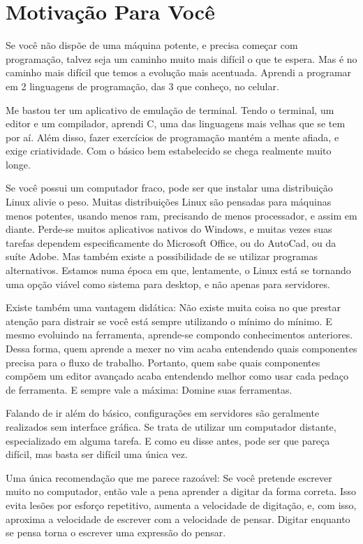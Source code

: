 \section{Motivação Para Você}
Se você não dispõe de uma máquina potente, e precisa começar com programação, talvez seja um caminho muito mais difícil o que te espera.
Mas é no caminho mais difícil que temos a evolução mais acentuada.
Aprendi a programar em 2 linguagens de programação, das 3 que conheço, no celular.

Me bastou ter um aplicativo de emulação de terminal.
Tendo o terminal, um editor e um compilador, aprendi C, uma das linguagens mais velhas que se tem por aí.
Além disso, fazer exercícios de programação mantém a mente afiada, e exige criatividade.
Com o básico bem estabelecido se chega realmente muito longe.


Se você possui um computador fraco, pode ser que instalar uma distribuição Linux alivie o peso.
Muitas distribuições Linux são pensadas para máquinas menos potentes, usando menos ram, precisando de menos processador, e assim em diante.
Perde-se muitos aplicativos nativos do Windows, e muitas vezes suas tarefas dependem especificamente do Microsoft Office, ou do AutoCad, ou da suíte Adobe.
Mas também existe a possibilidade de se utilizar programas alternativos.
Estamos numa época em que, lentamente, o Linux está se tornando uma opção viável como sistema para desktop, e não apenas para servidores.

Existe também uma vantagem didática:
Não existe muita coisa no que prestar atenção para distrair se você está sempre utilizando o mínimo do mínimo.
E mesmo evoluindo na ferramenta, aprende-se compondo conhecimentos anteriores.
Dessa forma, quem aprende a mexer no vim acaba entendendo quais componentes precisa para o fluxo de trabalho.
Portanto, quem sabe quais componentes compõem um editor avançado acaba entendendo melhor como usar cada pedaço de ferramenta.
E sempre vale a máxima: Domine suas ferramentas.

Falando de ir além do básico, configurações em servidores são geralmente realizados sem interface gráfica.
Se trata de utilizar um computador distante, especializado em alguma tarefa.
E como eu disse antes, pode ser que pareça difícil, mas basta ser difícil uma única vez.

Uma única recomendação que me parece razoável: Se você pretende escrever muito no computador, então vale a pena
aprender a digitar da forma correta.
Isso evita lesões por esforço repetitivo, aumenta a velocidade de digitação,
e, com isso, aproxima a velocidade de escrever com a velocidade de pensar.
Digitar enquanto se pensa torna o escrever uma expressão do pensar.

